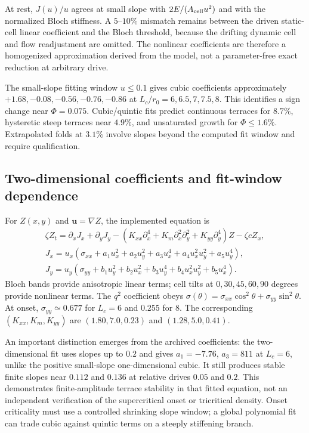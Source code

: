 At rest, $J(u)/u$ agrees at small slope with $2E/(A_{\rm cell}u^2)$ and with the normalized Bloch stiffness. A $5$--$10\%$ mismatch remains between the driven static-cell linear coefficient and the Bloch threshold, because the drifting dynamic cell and flow readjustment are omitted. The nonlinear coefficients are therefore a homogenized approximation derived from the model, not a parameter-free exact reduction at arbitrary drive.

The small-slope fitting window $u\leq0.1$ gives cubic coefficients approximately $+1.68,-0.08,-0.56,-0.76,-0.86$ at $L_c/r_0=6,6.5,7,7.5,8$. This identifies a sign change near $\Phi=0.075$. Cubic/quintic fits predict continuous terraces for $8.7\%$, hysteretic steep terraces near $4.9\%$, and unsaturated growth for $\Phi\leq1.6\%$. Extrapolated folds at $3.1\%$ involve slopes beyond the computed fit window and require qualification.

\subsection{Two-dimensional coefficients and fit-window dependence}
For $Z(x,y)$ and $\bm u=\nabla Z$, the implemented equation is
\begin{multline}
\zeta Z_t=\partial_xJ_x+\partial_yJ_y-
(K_{xx}\partial_x^4+K_m\partial_x^2\partial_y^2+K_{yy}\partial_y^4)Z-\zeta cZ_x,\\
J_x=u_x(\sigma_{xx}+a_1u_x^2+a_2u_y^2+a_3u_x^4+a_4u_x^2u_y^2+a_5u_y^4),\\
J_y=u_y(\sigma_{yy}+b_1u_y^2+b_2u_x^2+b_3u_y^4+b_4u_x^2u_y^2+b_5u_x^4).
\end{multline}
Bloch bands provide anisotropic linear terms; cell tilts at $0,30,45,60,90$ degrees provide nonlinear terms. The $q^2$ coefficient obeys $\sigma(\theta)=\sigma_{xx}\cos^2\theta+\sigma_{yy}\sin^2\theta$. At onset, $\sigma_{yy}\simeq0.677$ for $L_c=6$ and $0.255$ for $8$. The corresponding $(K_{xx},K_m,K_{yy})$ are $(1.80,7.0,0.23)$ and $(1.28,5.0,0.41)$.

An important distinction emerges from the archived coefficients: the two-dimensional fit uses slopes up to $0.2$ and gives $a_1=-7.76$, $a_3=811$ at $L_c=6$, unlike the positive small-slope one-dimensional cubic. It still produces stable finite slopes near $0.112$ and $0.136$ at relative drives $0.05$ and $0.2$. This demonstrates finite-amplitude terrace stability in that fitted equation, not an independent verification of the supercritical onset or tricritical density. Onset criticality must use a controlled shrinking slope window; a global polynomial fit can trade cubic against quintic terms on a steeply stiffening branch.

